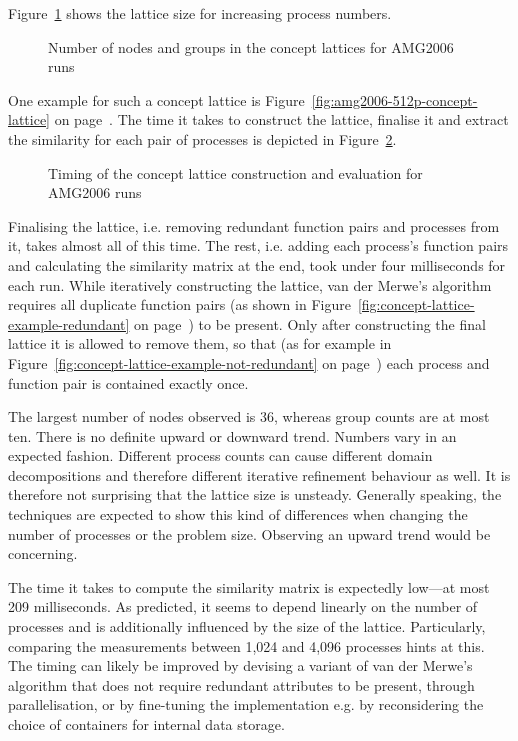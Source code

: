 \documentclass[a4paper, final, diplominf]{zih-template}
\begin{document}
Figure~\ref{fig:amg2006-node-and-group-counts} shows the lattice size for increasing process numbers.
\begin{figure}[b!]
	\centering
	
	
	\caption{Number of nodes and groups in the concept lattices for AMG2006 runs}
	\label{fig:amg2006-node-and-group-counts}
\end{figure}
One example for such a concept lattice is Figure~\ref{fig:amg2006-512p-concept-lattice} on page~\pageref{fig:amg2006-512p-concept-lattice}.
The time it takes to construct the lattice, finalise it and extract the similarity for each pair of processes is depicted in Figure~\ref{fig:amg2006-lattice-timing}.
\begin{figure}[b!]
	\centering
	
	\caption{Timing of the concept lattice construction and evaluation for AMG2006 runs}
	\label{fig:amg2006-lattice-timing}
\end{figure}
Finalising the lattice, i.e. removing redundant function pairs and processes from it, takes almost all of this time.
The rest, i.e. adding each process's function pairs and calculating the similarity matrix at the end, took under four milliseconds for each run.
While iteratively constructing the lattice, van der Merwe's algorithm requires all duplicate function pairs (as shown in Figure~\ref{fig:concept-lattice-example-redundant} on page~\pageref{fig:concept-lattice-example-redundant}) to be present.
Only after constructing the final lattice it is allowed to remove them, so that (as for example in Figure~\ref{fig:concept-lattice-example-not-redundant} on page~\pageref{fig:concept-lattice-example-not-redundant}) each process and function pair is contained exactly once.

The largest number of nodes observed is 36, whereas group counts are at most ten.
There is no definite upward or downward trend.
Numbers vary in an expected fashion.
Different process counts can cause different domain decompositions and therefore different iterative refinement behaviour as well.
It is therefore not surprising that the lattice size is unsteady.
Generally speaking, the techniques are expected to show this kind of differences when changing the number of processes or the problem size.
Observing an upward trend would be concerning.

The time it takes to compute the similarity matrix is expectedly low---at most 209 milliseconds.
As predicted, it seems to depend linearly on the number of processes and is additionally influenced by the size of the lattice.
Particularly, comparing the measurements between 1,024 and 4,096 processes hints at this.
The timing can likely be improved by devising a variant of van der Merwe's algorithm that does not require redundant attributes to be present, through parallelisation, or by fine-tuning the implementation e.g. by reconsidering the choice of containers for internal data storage.
\end{document}
